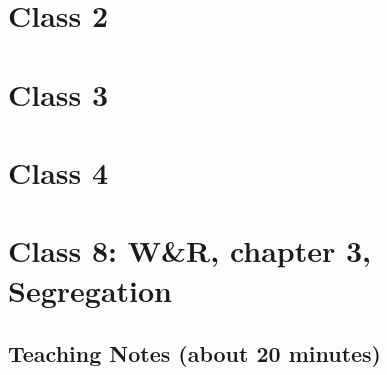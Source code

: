 

\chapter{Class 2}

\chapter{Class 3}

\chapter{Class 4}

\chapter{Class 8: W\&R, chapter 3, Segregation}

\section{Teaching Notes (about 20 minutes)}

